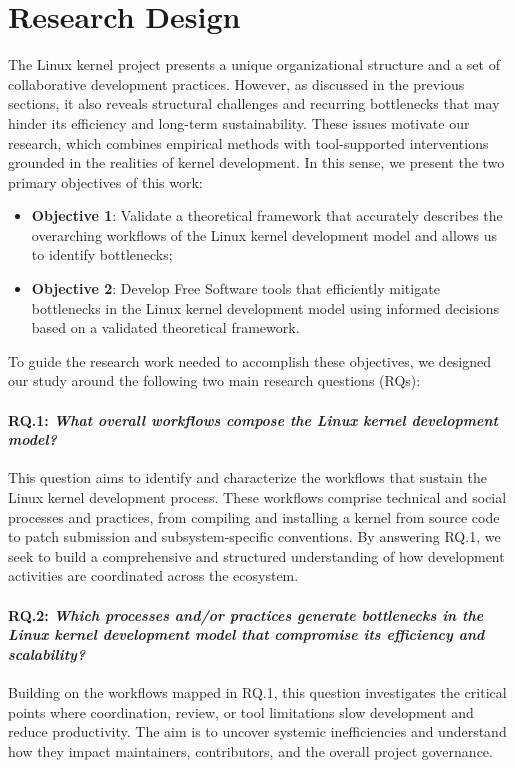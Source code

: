 \documentclass[sigconf]{acmart} %
\begin{document}
\section{Research Design}

The Linux kernel project presents a unique organizational structure and a set of
collaborative development practices. However, as discussed in the previous
sections, it also reveals structural challenges and recurring bottlenecks that
may hinder its efficiency and long-term sustainability. These issues motivate
our research, which combines empirical methods with tool-supported interventions
grounded in the realities of kernel development. In this sense, we present the
two primary objectives of this work:

\begin{itemize}
    \item \textbf{Objective 1}: Validate a theoretical framework that accurately
    describes the overarching workflows of the Linux kernel development model
    and allows us to identify bottlenecks;
    \item \textbf{Objective 2}: Develop Free Software tools that efficiently
    mitigate bottlenecks in the Linux kernel development model using informed
    decisions based on a validated theoretical framework.
\end{itemize}

To guide the research work needed to accomplish these objectives, we designed
our study around the following two main research questions (RQs):

\paragraph{\textbf{RQ.1}: \textit{What overall workflows compose the Linux
kernel development model?}} This question aims to identify and characterize the
workflows that sustain the Linux kernel development process. These workflows
comprise technical and social processes and practices, from compiling and
installing a kernel from source code to patch submission and subsystem-specific
conventions. By answering RQ.1, we seek to build a comprehensive and structured
understanding of how development activities are coordinated across the
ecosystem.
    
\paragraph{\textbf{RQ.2}: \textit{Which processes and/or practices generate
bottlenecks in the Linux kernel development model that compromise its efficiency
and scalability?}} Building on the workflows mapped in RQ.1, this question
investigates the critical points where coordination, review, or tool limitations
slow development and reduce productivity. The aim is to uncover systemic
inefficiencies and understand how they impact maintainers, contributors, and the
overall project governance.
\end{document}

